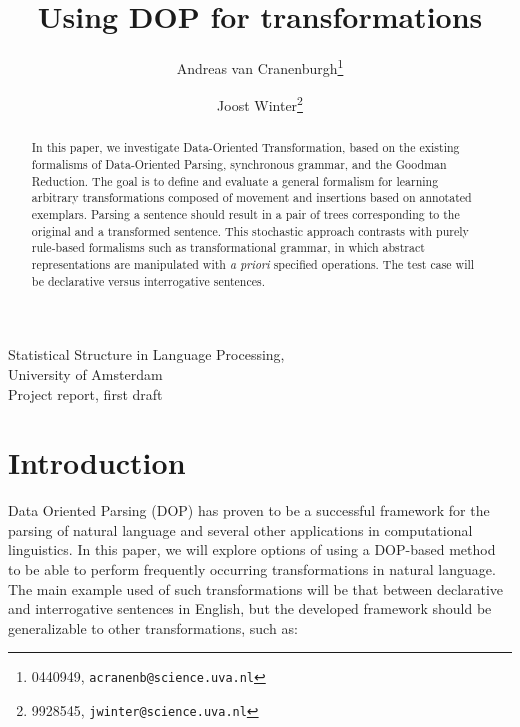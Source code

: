 \documentclass[a4paper]{article}
\theoremstyle{definition}
\begin{document}
\title{Using DOP for transformations}
\author{Andreas van Cranenburgh\footnote{0440949, \texttt{acranenb@science.uva.nl}} 
\and Joost Winter\footnote{9928545, \texttt{jwinter@science.uva.nl}}}
\maketitle

\begin{center}
Statistical Structure in Language Processing, \\
University of Amsterdam \\
Project report, first draft
\end{center}

\vspace{5em}

\begin{abstract}
In this paper, we investigate Data-Oriented Transformation,
based on the existing formalisms of Data-Oriented Parsing, synchronous
grammar, and the Goodman Reduction. The goal is to define and evaluate a general
formalism for learning arbitrary transformations composed of movement and insertions
based on annotated exemplars.  Parsing a sentence should result in a pair of trees
corresponding to the original and a transformed sentence. 
This stochastic approach contrasts with purely rule-based formalisms such as
transformational grammar, in which abstract representations are manipulated
with {\em a priori} specified operations. %
The test case will be declarative versus interrogative sentences.
\end{abstract}

\newpage
\tableofcontents

\section{Introduction}

Data Oriented Parsing (DOP) has proven to be a successful framework for the
parsing of natural language and several other applications in computational
linguistics. In this paper, we will explore options of using a DOP-based method
to be able to perform frequently occurring transformations in natural language.
The main example used of such transformations will be that between declarative
and interrogative sentences in English, but the developed framework should be
generalizable to other transformations, such as:
\end{document}
